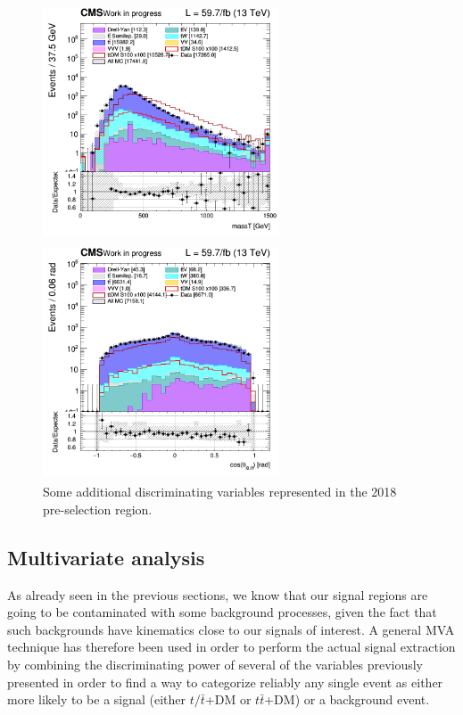 \documentclass[a4paper, 10pt, openright]{report}
\begin{document}
\begin{figure}[htbp]
\begin{minipage}[b]{.48\textwidth}
\includegraphics[width=7cm, height=7cm]{figs/2018/SmearSR-ttDM-scalar100/log_cratio_topCR_ll_massT.png}
\end{minipage}\hfill
\begin{minipage}[b]{.48\textwidth}
\includegraphics[width=7cm, height=7cm]{figs/2018/SmearSR-ttDM-scalar100/log_cratio_topCR_ll_costhetall.png}
\end{minipage} \hfill
\caption{Some additional discriminating variables represented in the 2018 pre-selection region.}
\label{fig:otherVar}
\end{figure}

\subsection{Multivariate analysis} \label{section:NN}

As already seen in the previous sections, we know that our signal regions are going to be contaminated with some background processes, given the fact that such backgrounds have kinematics close to our signals of interest. A general \acf{MVA} technique has therefore been used in order to perform the actual signal extraction by combining the discriminating power of several of the variables previously presented in order to find a way to categorize reliably any single event as either more likely to be a signal (either $t/\bar t$+DM or $t \bar t$+DM) or a background event.
\end{document}
